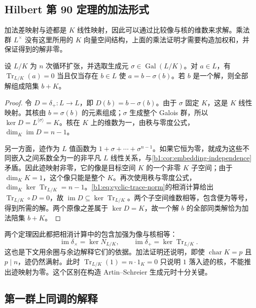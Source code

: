 \subsection{Hilbert 第 90 定理的加法形式}
\label{b1:subsec:2002:02}

加法差映射与迹都是 \(K\) 线性映射，因此可以通过比较像与核的维数来求解。乘法群 \(L^\times\) 没有这里所用的 \(K\) 向量空间结构，上面的乘法证明才需要构造加权和，并保证得到的解非零。

\begin{theorem}\label{b1:thm:hilbert90-additive}
	设 \(L/K\) 为 \(n\) 次循环扩张，并选取生成元 \(\sigma\in\operatorname{Gal}(L/K)\)。对 \(a\in L\)，有 \(\operatorname{Tr}_{L/K}(a)=0\) 当且仅当存在 \(b\in L\) 使 \(a=b-\sigma(b)\)。若 \(b\) 是一个解，则全部解组成陪集 \(b+K\)。
\end{theorem}
\begin{proof}
	令 \(D=\delta_+:L\rightarrow L\)，即 \(D(b)=b-\sigma(b)\)。由于 \(\sigma\) 固定 \(K\)，这是 \(K\) 线性映射。其核由 \(b=\sigma(b)\) 的元素组成；\(\sigma\) 生成整个 Galois 群，所以 \(\ker D=L^{\langle\sigma\rangle}=K\)。核在 \(K\) 上的维数为一，由秩与零度公式，\(\dim_K\operatorname{im}D=n-1\)。

	另一方面，迹作为 \(L\) 值函数为 \(1+\sigma+\cdots+\sigma^{n-1}\)。如果它恒为零，就成为这些不同嵌入之间系数全为一的非平凡 \(L\) 线性关系，与\cref{b1:cor:embedding-independence}矛盾。因此迹映射非零，它的像是目标空间 \(K\) 的一个非零 \(K\) 子空间；由于 \(\dim_KK=1\)，这个像只能是整个 \(K\)。再次使用秩与零度公式，\(\dim_K\ker\operatorname{Tr}_{L/K}=n-1\)。\eqref{b1:eq:cyclic-trace-norm}的相消计算给出 \(\operatorname{Tr}_{L/K}\circ D=0\)，故 \(\operatorname{im}D\subseteq\ker\operatorname{Tr}_{L/K}\)。两个子空间维数相等，包含便为等号，得到所需的解。两个原像之差属于 \(\ker D=K\)，故一个解 \(b\) 的全部同类解恰为加法陪集 \(b+K\)。
\end{proof}

两个定理因此都把相消计算中的包含加强为像与核相等：
\[
	\operatorname{im}\delta_\times=\ker N_{L/K},\qquad \operatorname{im}\delta_+=\ker\operatorname{Tr}_{L/K}.
\]
这也是下文用余圈与余边解释它们的依据。加法证明还说明，即使 \(\operatorname{char}K=p\) 且 \(p\mid n\)，迹仍然满射。此时 \(\operatorname{Tr}_{L/K}(1)=n\cdot1_K=0\) 只说明 \(1\) 落入迹的核，不能推出迹映射为零。这个区别在构造 Artin--Schreier 生成元时十分关键。

\subsection{第一群上同调的解释}
\label{b1:subsec:2002:03}

